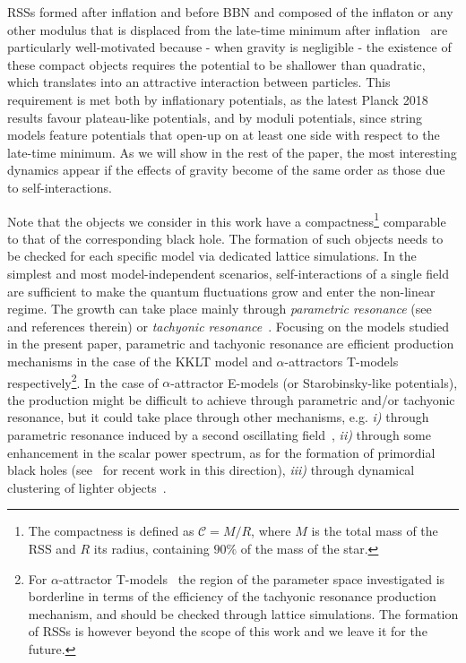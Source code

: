 \documentclass[11pt,a4paper]{article}
\begin{document}
RSSs formed after inflation and before BBN and composed of the inflaton or any other modulus that is displaced from the late-time minimum after inflation~\cite{Coughlan:1983ci, deCarlos:1993wie, Banks:1993en, Kane:2015jia} are particularly well-motivated because - when gravity is negligible - the existence of these compact objects requires the potential to be shallower than quadratic, which translates into an attractive interaction between particles. This requirement is met both by inflationary potentials, as the latest Planck 2018~\cite{Akrami:2018odb} results favour plateau-like potentials, and by moduli potentials, since string models feature potentials that open-up on at least one side with respect to the late-time minimum. As we will show in the rest of the paper, the most interesting dynamics appear	 if the effects of gravity become of the same order as those due to self-interactions.

Note that the objects we consider in this work have a compactness\footnote{The compactness is defined as $\mathcal{C} = M/R$, where $M$ is the total mass of the RSS and $R$ its radius, containing $90\%$ of the mass of the star.} comparable to that of the corresponding black hole. The formation of such objects needs to be checked for each specific model via dedicated lattice simulations. In the simplest and most model-independent scenarios, self-interactions of a single field are sufficient to make the quantum fluctuations grow and enter the non-linear regime. The growth can take place mainly through \textit{parametric resonance} (see~\cite{Amin:2014eta} and references therein) or \textit{tachyonic resonance}~\cite{Brax:2010ai}. Focusing on the models studied in the present paper, parametric and tachyonic resonance are efficient production mechanisms in the case of the KKLT model and $\alpha$-attractors T-models respectively\footnote{For $\alpha$-attractor T-models~\cite{Kallosh:2013yoa, Kallosh:2015lwa} the region of the parameter space investigated is borderline in terms of the efficiency of the tachyonic resonance production mechanism, and should be checked through lattice simulations. The formation of RSSs is however beyond the scope of this work and we leave it for the future.}. In the case of $\alpha$-attractor E-models (or Starobinsky-like potentials), the production might be difficult to achieve through parametric and/or tachyonic resonance, but it could take place through other mechanisms, e.g. \textit{i)} through parametric resonance induced by a second oscillating field~\cite{Kofman:1997yn}, \textit{ii)} through some enhancement in the scalar power spectrum, as for the formation of primordial black holes (see~\cite{Widdicombe:2018oeo} for recent work in this direction), \textit{iii)} through dynamical clustering of lighter objects~\cite{Amin:2019ums}.
\end{document}
